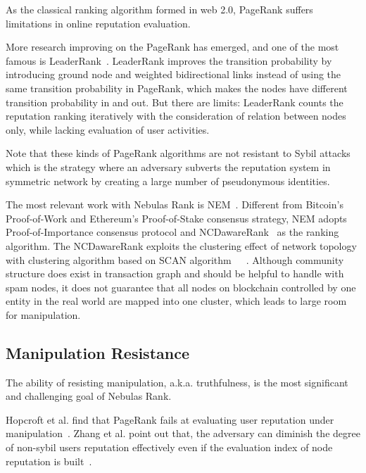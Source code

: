 As the classical ranking algorithm formed in web 2.0, PageRank suffers limitations in online reputation evaluation.


More research improving on the PageRank has emerged, and one of the most famous is LeaderRank~\cite{Li2014}. LeaderRank improves the transition probability by introducing ground node and weighted bidirectional links instead of using the same transition probability in PageRank, which makes the nodes have different transition probability in and out. But there are limits: LeaderRank counts the reputation ranking iteratively with the consideration of relation between nodes only, while lacking evaluation of user activities.


Note that these kinds of PageRank algorithms are not resistant to Sybil attacks~\cite{cheng2006manipulability} which is the strategy where an adversary subverts the reputation system in symmetric network by creating a large number of pseudonymous identities.

The most relevant work with Nebulas Rank is NEM~\cite{nem}. Different from Bitcoin's Proof-of-Work and Ethereum's Proof-of-Stake consensus strategy, NEM adopts Proof-of-Importance consensus protocol and NCDawareRank~\cite{Nikolakopoulos2013} as the ranking algorithm. The NCDawareRank exploits the clustering effect of network topology with clustering algorithm based on SCAN algorithm~\cite{xu2007scan}~\cite{shiokawa2015scan}~\cite{chang2017mathsf}. Although community structure does exist in transaction graph and should be helpful to handle with spam nodes, it does not guarantee that all nodes on blockchain controlled by one entity in the real world are mapped into one cluster, which leads to large room for manipulation.


\subsection{Manipulation Resistance}
The ability of resisting manipulation, a.k.a. truthfulness, is the most significant and challenging goal of Nebulas Rank. 

Hopcroft et al. find that PageRank fails at evaluating user reputation under manipulation~\cite{hopcroft2007manipulation}. Zhang et al. point out that, the adversary can diminish the degree of non-sybil users reputation effectively even if the evaluation index of node reputation is built~\cite{zhang2016truetop}.


